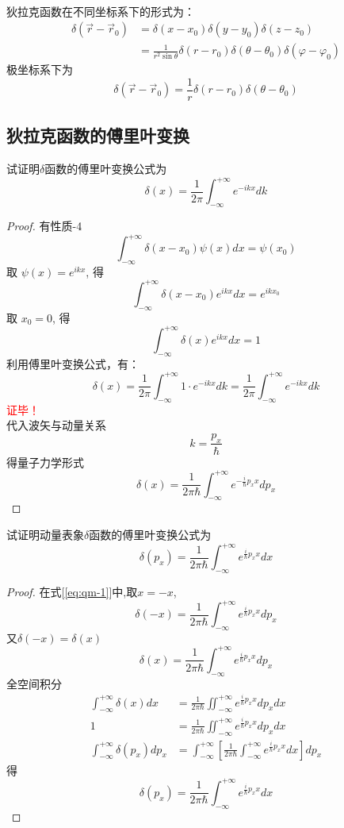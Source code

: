~~\\
狄拉克函数在不同坐标系下的形式为：
\[
		\begin{aligned}
		  \delta (\vec{r}-\vec{r}_0) &=  \delta (x-x_0) \delta (y-y_0) \delta (z-z_0)\\
		  &=  \frac{1}{r^2\sin\theta}\delta (r-r_0) \delta (\theta -\theta_0) \delta (\varphi -\varphi_0)
		\end{aligned}
		   \]
极坐标系下为 
\[ \delta (\vec{r}-\vec{r}_0) =  \frac{1}{r}\delta (r-r_0) \delta (\theta -\theta_0) \]

\subsection{狄拉克函数的傅里叶变换}
\begin{example}
	试证明$\delta$函数的傅里叶变换公式为
	\[ \boxed{\delta(x) = \frac{1}{2\pi}\int_{-\infty}^{+\infty} e^{-ikx} d k} \]
\end{example}
\begin{proof}
有性质-4
 \[\int_{-\infty}^{+\infty} \delta(x-x_0) \psi (x) d x = \psi (x_0)\]
取 $ \psi (x) = e^{ikx} $, 得
\[\int_{-\infty}^{+\infty} \delta(x-x_0) e^{ikx} d x = e^{ikx_0}\]
取 $ x_0 =0 $, 得
\[\int_{-\infty}^{+\infty} \delta(x) e^{ikx} d x = 1\]
利用傅里叶变换公式，有：
\[ \delta(x) = \frac{1}{2\pi} \int_{-\infty}^{+\infty} 1 \cdot e^{-ikx} d k = \frac{1}{2\pi} \int_{-\infty}^{+\infty} e^{-ikx} d k \]
\textcolor{red}{证毕！} \\
代入波矢与动量关系$$ k = \frac{p_x}{\hbar}$$
得量子力学形式
\begin{equation}\label{eq:qm-1}
\boxed{\delta(x) = \frac{1}{2\pi\hbar} \int_{-\infty}^{+\infty} e^{-\frac{i}{\hbar}p_xx} d p_x }
\end{equation}
\end{proof}

\begin{example}
	试证明动量表象$\delta$函数的傅里叶变换公式为
	\[\delta(p_x) = \frac{1}{2\pi\hbar} \int_{-\infty}^{+\infty} e^{\frac{i}{\hbar} p_x x} d x \]
\end{example}
\begin{proof}
	在式[\ref{eq:qm-1}]中,取$x=-x$, 
	\[ \delta(-x) = \frac{1}{2\pi\hbar} \int_{-\infty}^{+\infty} e^{\frac{i}{\hbar}p_xx} d p_x \]
	又$\delta(-x)=\delta(x)$
	\[ \delta(x) = \frac{1}{2\pi\hbar} \int_{-\infty}^{+\infty} e^{\frac{i}{\hbar}p_xx} d p_x \]
	全空间积分
	\[ 
	\begin{aligned}
	\int_{-\infty}^{+\infty} \delta(x) dx &= \frac{1}{2\pi\hbar} \iint_{-\infty}^{+\infty} e^{\frac{i}{\hbar}p_xx} d p_x dx \\
	 1 &= \frac{1}{2\pi\hbar} \iint_{-\infty}^{+\infty} e^{\frac{i}{\hbar}p_xx}   dp_x dx\\
	\int_{-\infty}^{+\infty} \delta(p_x) dp_x &= \int_{-\infty}^{+\infty} \left[\frac{1}{2\pi\hbar} \int_{-\infty}^{+\infty} e^{\frac{i}{\hbar}p_xx}  dx\right] dp_x 
	\end{aligned}
	\]	
	得
	\[\delta(p_x) = \frac{1}{2\pi\hbar} \int_{-\infty}^{+\infty} e^{\frac{i}{\hbar}p_x x}  dx\]
\end{proof}

